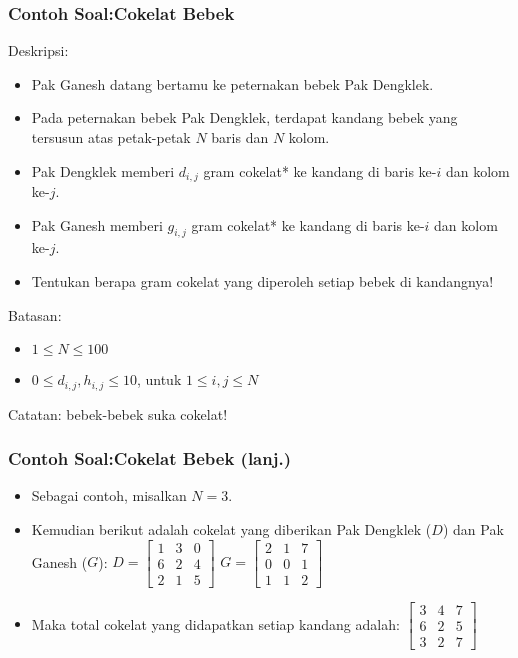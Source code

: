 \documentclass{beamer}
\begin{document}
\begin{frame}
\frametitle{Contoh Soal:\newline Cokelat Bebek}
Deskripsi:
\begin{itemize}
	\item Pak Ganesh datang bertamu ke peternakan bebek Pak Dengklek.
	\item Pada peternakan bebek Pak Dengklek, terdapat kandang bebek yang tersusun atas petak-petak $N$ baris dan $N$ kolom.
	\item Pak Dengklek memberi $d_{i,j}$ gram cokelat* ke kandang di baris ke-$i$ dan kolom ke-$j$.
	\item Pak Ganesh memberi $g_{i,j}$ gram cokelat* ke kandang di baris ke-$i$ dan kolom ke-$j$.
	\item Tentukan berapa gram cokelat yang diperoleh setiap bebek di kandangnya!
\end{itemize}
Batasan:
\begin{itemize}
	\item $1 \le N \le 100$
	\item $0 \le d_{i,j}, h_{i,j} \le 10$, untuk $1 \le i,j \le N$
\end{itemize}

\tiny *Catatan: bebek-bebek suka cokelat! 
\end{frame}

\begin{frame}
\frametitle{Contoh Soal:\newline Cokelat Bebek (lanj.)}
\begin{itemize}
	\item Sebagai contoh, misalkan $N = 3$.
	\item Kemudian berikut adalah cokelat yang diberikan Pak Dengklek ($D$) dan Pak Ganesh ($G$):
	\vfill
	\(D = 
	\left[\begin{matrix}
	1 & 3 & 0 \\
	6 & 2 & 4 \\
	2 & 1 & 5 
	\end{matrix}\right]
	\)
	\hfil
	\(G =
	\left[\begin{matrix}
	2 & 1 & 7 \\
	0 & 0 & 1 \\
	1 & 1 & 2 
	\end{matrix}\right]
	\) \centering
	\item Maka total cokelat yang didapatkan setiap kandang adalah:
	\vfill
	\(
	\left[\begin{matrix}
	3 & 4 & 7 \\
	6 & 2 & 5 \\
	3 & 2 & 7 
	\end{matrix}\right]
	\) \centering
\end{itemize}
\end{frame}
\end{document}
